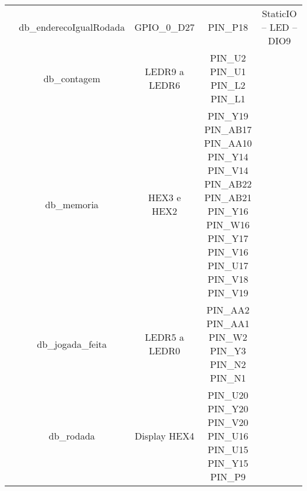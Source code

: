 \documentclass[amsmath,amssymb,floatfix]{report}
\begin{document}
\begin{table}[H]
\begin{tabular}{c|c|c|c|c|}
\multicolumn{1}{|c|}{}                           & db\_enderecoIgualRodada & GPIO\_0\_D27         & PIN\_P18                                                                                                                                                                              & StaticIO – LED – DIO9          \\ \cline{2-5} 
\multicolumn{1}{|c|}{}                           & db\_contagem            & LEDR9 a LEDR6        & \thead{PIN\_U2\\ PIN\_U1\\ PIN\_L2\\ PIN\_L1}                                                                                                                                         & \multicolumn{1}{l|}{}          \\ \cline{2-5} 
\multicolumn{1}{|c|}{}                           & db\_memoria             & HEX3 e HEX2          & \thead{PIN\_Y19 \\ PIN\_AB17 \\ PIN\_AA10 \\  PIN\_Y14 \\ PIN\_V14 \\  PIN\_AB22 \\  PIN\_AB21 \\PIN\_Y16 \\ PIN\_W16 \\ PIN\_Y17 \\ PIN\_V16 \\ PIN\_U17 \\ PIN\_V18 \\ PIN\_V19 \\} & \multicolumn{1}{l|}{}          \\ \cline{2-5} 
\multicolumn{1}{|c|}{}                           & db\_jogada\_feita       & LEDR5 a LEDR0        & \thead{PIN\_AA2\\ PIN\_AA1\\ PIN\_W2\\ PIN\_Y3\\ PIN\_N2\\ PIN\_N1}                                                                                                                   & \multicolumn{1}{l|}{}          \\ \cline{2-5} 
\multicolumn{1}{|c|}{}                           & db\_rodada              & Display HEX4         & \thead{PIN\_U20\\ PIN\_Y20\\ PIN\_V20\\ PIN\_U16\\ PIN\_U15\\ PIN\_Y15\\ PIN\_P9}                                                                                                     & \multicolumn{1}{l|}{}          \\ \cline{2-5} 

\end{tabular}
\end{table}
\end{document}
